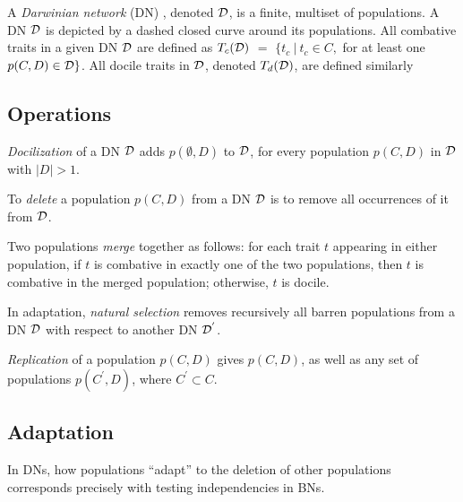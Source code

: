 
		A \emph{Darwinian network} (DN) , denoted $\cal{D}$, is a finite, multiset of populations.
		A DN $\cal{D}$ is depicted by a dashed closed curve around its populations.
		All combative traits in a given DN $\cal{D}$ are defined as $T_c(\cal{D})$ $=$ $\{t_{c} ~ | ~ t_{c} \in C,$ for at least one $p(C,D) \in \cal{D}\}$.
		All docile traits in $\cal{D}$, denoted $T_d(\cal{D})$, are defined similarly


\subsection{Operations}
\label{subsec:operations}



		
		\emph{Docilization} of a DN $\cal{D}$ adds $p(\emptyset,D)$ to $\cal D$, for every population $p(C,D)$ in ${\cal D}$ with $|D| > 1$.
		

		
		To \emph{delete} a population $p(C,D)$ from a DN $\cal{D}$ is to remove all occurrences of it from $\cal{D}$.
		

		
		Two populations \emph{merge} together as follows: for each trait $t$ appearing in either population, if $t$ is combative in exactly one of the two populations, then $t$ is combative in the merged population; otherwise, $t$ is docile.
		

		
		In adaptation, \emph{natural selection} removes recursively all barren populations from a DN $\cal{D}$ with respect to another DN ${\cal{D}}^{'}$.
		

		
		\emph{Replication} of a population $p(C,D)$ gives $p(C,D)$, as well as any set of populations $p(C^{'}, D)$, where $C^{'} \subset C$.
		

\subsection{Adaptation}
\label{subsec:adaptation}


In DNs, how populations ``adapt'' to the deletion of other populations corresponds precisely with testing independencies in BNs.

